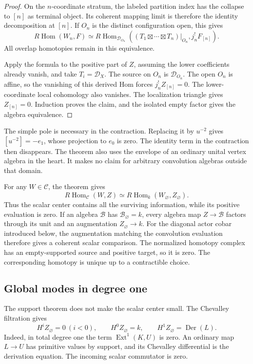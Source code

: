 \begin{proof}
On the $n$-coordinate
stratum, the labeled
partition index has the
collapse to $[n]$ as
terminal object. Its
coherent mapping limit is
therefore the identity
decomposition at $[n]$.
If $O_n$ is the distinct
configuration open, this
gives
\[
 R\operatorname{Hom}(W_n,F)
 \simeq
 R\operatorname{Hom}_{\mathcal D_{O_n}}
 ((T_1\boxtimes\cdots\boxtimes T_n)|_{O_n},
       j_n^!F_{[n]}).
\]
All overlap homotopies
remain in this equivalence.

Apply the formula to the
positive part of $Z$,
assuming the lower
coefficients already
vanish, and take
$T_i=\mathcal D_X$.
The source on $O_n$
is $\mathcal D_{O_n}$.
The open $O_n$ is affine,
so the vanishing of this
derived Hom forces
$j_n^!Z_{[n]}=0$.
The lower-coordinate
local cohomology also
vanishes. The localization
triangle gives $Z_{[n]}=0$.
Induction proves the
claim, and the isolated
empty factor gives the
algebra equivalence.
\end{proof}

The simple pole is necessary
in the contraction.
Replacing it by $u^{-2}$
gives $[u^{-2}]=-e_1$,
whose projection to $e_0$
is zero. The identity
term in the contraction
then disappears.
The theorem also uses
the envelope of an
ordinary unital vertex
algebra in the heart.
It makes no claim for
arbitrary convolution
algebras outside that
domain.

For any $W\in\mathcal C$,
the theorem gives
\[
 R\operatorname{Hom}_{\mathcal C}(W,Z)
 \simeq
 R\operatorname{Hom}_k(W_\varnothing,Z_\varnothing).
\]
Thus the scalar center
contains all the surviving
information, while its
positive evaluation is
zero. If an algebra
$\mathcal B$ has
$\mathcal B_\varnothing=k$,
every algebra map
$Z\to\mathcal B$ factors
through its unit and an
augmentation
$Z_\varnothing\to k$.
For the diagonal actor
cobar introduced below,
the augmentation matching
the convolution evaluation
therefore gives a coherent
scalar comparison.
The normalized homotopy
complex has an empty-supported
source and positive target,
so it is zero. The
corresponding homotopy is
unique up to a contractible
choice.

\subsection{Global modes in degree one}
\label{v4-arith:centers:subsec:global-modes}

The support theorem does
not make the scalar
center small. The
Chevalley filtration gives
\[
 H^iZ_\varnothing=0\ (i<0),\qquad
 H^0Z_\varnothing=k,\qquad
 H^1Z_\varnothing=\operatorname{Der}(L).
\]
Indeed, in total degree
one the term
$\operatorname{Ext}^1(K,U)$
is zero. An ordinary
map $L\to U$ has
primitive values by
support, and its
Chevalley differential
is the derivation
equation. The incoming
scalar commutator is
zero.

